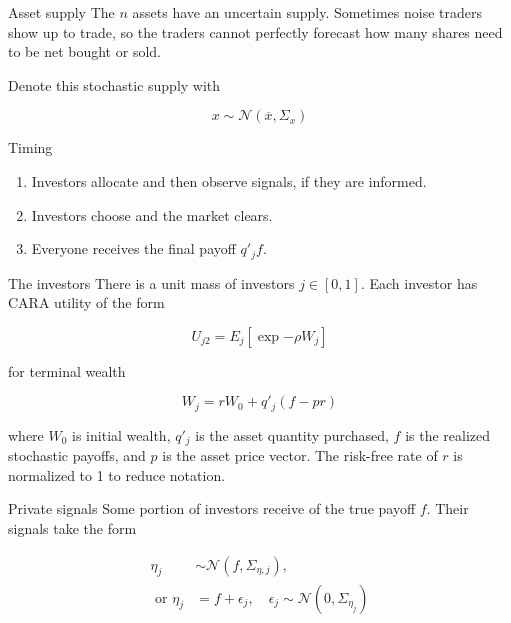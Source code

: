 \documentclass[
  ignorenonframetext,
]{beamer}
\providecommand{\tightlist}{%
  \setlength{\itemsep}{0pt}\setlength{\parskip}{0pt}}
\begin{document}
\begin{frame}{Asset supply}
\protect\hypertarget{asset-supply}{}
The \(n\) assets have an uncertain supply. Sometimes noise traders show
up to trade, so the traders cannot perfectly forecast how many shares
need to be net bought or sold.

Denote this stochastic supply with

\[
x \sim \mathcal{N}(\overline x, \Sigma_x)
\]
\end{frame}

\begin{frame}{Timing}
\protect\hypertarget{timing}{}
\begin{enumerate}
\tightlist
\item
  Investors allocate  and then observe signals, if they
  are informed.
\item
  Investors choose  and the market clears.
\item
  Everyone receives the final payoff \(q'_j f\).
\end{enumerate}
\end{frame}

\begin{frame}{The investors}
\protect\hypertarget{the-investors}{}
There is a unit mass of investors \(j \in [0,1]\). Each investor has
CARA utility of the form

\[
U_{j2} = E_j[\exp{-\rho W_j}]
\]

for terminal wealth

\[
W_j = r W_0 + q'_j (f - pr)
\]

where \(W_0\) is initial wealth, \(q'_j\) is the asset quantity
purchased, \(f\) is the realized stochastic payoffs, and \(p\) is the
asset price vector. The risk-free rate of \(r\) is normalized to 1 to
reduce notation.
\end{frame}

\begin{frame}{Private signals}
\protect\hypertarget{private-signals}{}
Some portion of investors receive  of the true
payoff \(f\). Their signals take the form

\begin{align}
    \eta_j &\sim \mathcal{N}(f, \Sigma_{\eta,j}), \\
    \text{ or } \eta_j &= f + \epsilon_j, \quad \epsilon_j \sim \mathcal{N}(0, \Sigma_{\eta_j})
\end{align}
\end{frame}
\end{document}
